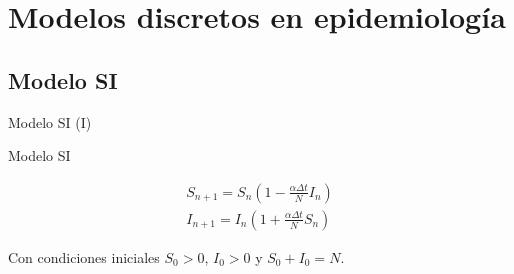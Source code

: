 

\section{Modelos discretos en epidemiología}


\subsection{Modelo SI}


\begin{frame}{Modelo SI (I)}

    \begin{block}{Modelo SI  \cite{allenDiscretetimeSISIR1994}}

        \begin{equation}
        \label{eqn: SI}
        \begin{aligned}
        S_{n+1}=S_n\left( 1-\frac{\alpha\Delta t}{N}I_n\right) \\
        I_{n+1}=I_n\left( 1+\frac{\alpha\Delta t}{N}S_n\right)
        \end{aligned}
        \end{equation}

        Con condiciones iniciales $S_0>0$, $I_0>0$ y $S_0+I_0=N$.
        

    \end{block}  


\end{frame}

